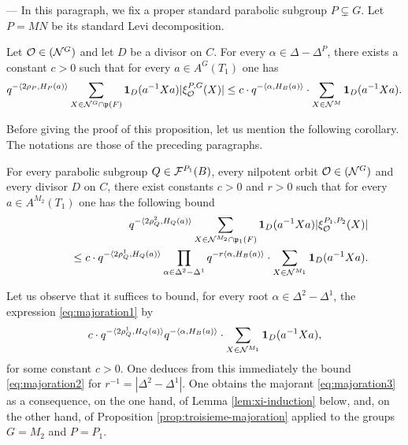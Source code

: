 \begin{paragr} --- \label{S:troisieme-majoration} In this paragraph, we fix a proper standard parabolic subgroup $P\subsetneq G$. Let $P=MN$ be its standard Levi decomposition.

\begin{proposition}\label{prop:troisieme-majoration}
  Let $\mathcal{O}\in (\mathcal{N}^G)$ and let $D$ be a divisor on $C$. For every $\alpha\in \Delta-\Delta^P$, there exists a constant $c>0$ such that for every $a\in A^G(T_1)$ one has
$$q^{-\langle 2\rho_P,H_P(a)\rangle} \sum_{X\in \mathcal{N}^G\cap \mathfrak{p}(F)} \mathbf{1}_D(a^{-1}Xa)|\xi_{\mathcal{O}}^{P,G}(X)| \leq c\cdot q^{-\langle \alpha,H_B(a)\rangle}\cdot \sum_{X\in \mathcal{N}^M} \mathbf{1}_D(a^{-1}Xa).$$
\end{proposition}

Before giving the proof of this proposition, let us mention the following corollary. The notations are those of the preceding paragraphs.

\begin{corollaire}\label{cor:troisieme-majoration}
  For every parabolic subgroup $Q\in \mathcal{F}^{P_1}(B)$, every nilpotent orbit $\mathcal{O}\in (\mathcal{N}^G)$ and every divisor $D$ on $C$, there exist constants $c>0$ and $r>0$ such that for every $a\in A^{M_2}(T_1)$ one has the following bound
\begin{eqnarray}
  &&q^{-\langle 2\rho_Q^2,H_Q(a)\rangle} \sum_{X\in \mathcal{N}^{M_2}\cap \mathfrak{p}_1(F)} \mathbf{1}_D(a^{-1}Xa)|\xi_{\mathcal{O}}^{P_1,P_2}(X)| \label{eq:majoration1}\\
  &&\qquad \leq c\cdot q^{-\langle 2\rho_Q^1,H_Q(a)\rangle} \prod_{\alpha\in \Delta^2-\Delta^1} q^{-r\langle \alpha,H_B(a)\rangle}\cdot \sum_{X\in \mathcal{N}^{M_1}} \mathbf{1}_D(a^{-1}Xa). \label{eq:majoration2}
\end{eqnarray}
\end{corollaire}

\begin{preuve}
  Let us observe that it suffices to bound, for every root $\alpha\in \Delta^2-\Delta^1$, the expression \eqref{eq:majoration1} by
\begin{equation}
  \label{eq:majoration3}
  c\cdot q^{-\langle 2\rho_Q^1,H_Q(a)\rangle} q^{-\langle \alpha,H_B(a)\rangle}\cdot \sum_{X\in \mathcal{N}^{M_1}} \mathbf{1}_D(a^{-1}Xa),
\end{equation}
for some constant $c>0$. One deduces from this immediately the bound \eqref{eq:majoration2} for $r^{-1}=|\Delta^2-\Delta^1|$. One obtains the majorant \eqref{eq:majoration3} as a consequence, on the one hand, of Lemma \ref{lem:xi-induction} below, and, on the other hand, of Proposition \ref{prop:troisieme-majoration} applied to the groups $G=M_2$ and $P=P_1$.
\end{preuve}


\end{paragr}
